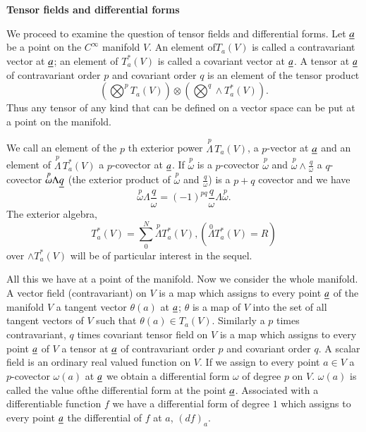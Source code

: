 \medskip
\noindent
{\bf Tensor fields and differential forms}

We proceed to examine the question of tensor fields and differential
forms. Let $\underline{a}$ be a point on the $C^{\infty}$ manifold $V$. An
element of\pageoriginale $T_{a}(V)$ is called a contravariant vector
at $\underline{a}$; an element of $T^{\ast}_{a}(V)$ is called a covariant
vector at $\underline{a}$. A tensor at $\underline{a}$ of contravariant order $p$
and covariant order $q$ is an element of the tensor product
$$
\left(\bigotimes^{p}T_{a}(V)\right)\otimes
\left(\bigotimes^{q} \wedge T^{\ast}_{a}(V)\right).
$$
Thus any tensor of any kind that can be defined on a vector space can
be put at a point on the manifold.

We call an element of the $p$ th exterior power
$\overset{p}{\Lambda}\, T_{a}(V)$, a $p$-vector at $\underline{a}$ and an
element of $\overset{p}{\Lambda} \,T^{\ast}_{a}(V)$ a $p$-covector at
$\underline{a}$. If $\overset{p}{\omega}$ is a $p$-covector 
$\overset{p}{\omega}$ and $\overset{p}{\omega} \wedge
\frac{q}{\omega}$ a $q$-covector
$\overset{p}{\omega}\Lambda \underline{q}$ (the exterior product 
of $\overset{p}{\omega}$ and $\frac{q}{\omega}$) is a $p+q$ covector
and we have
$$
\overset{p}{\omega}\Lambda
\frac{q}{\omega}=(-1)^{pq}\frac{q}{\omega}\Lambda \overset{p}{\omega}.
$$
The exterior algebra,
$$
T^{\ast}_{a}(V)=\sum^{N}_{0}\overset{p}{\Lambda}T^{\ast}_{a}(V),
(\overset{0}{\Lambda}T^{\ast}_{a}(V)=R)   
$$
over $\wedge T^{\ast}_{a}(V)$ will be of particular interest in the sequel.

All this we have at a point of the manifold. Now we consider the whole
manifold. A vector field (contravariant) on $V$ is a map which assigns
to every point $\underline{a}$ of the manifold $V$ a tangent vector
$\theta(a)$ at $\underline{a}$;  $\theta$ is a map of $V$ into the set of all tangent
vectors of $V$ such that $\theta(a)\in T_{a}(V)$. Similarly a $p$
times contravariant, $q$ times covariant tensor field on $V$ is a map
which assigns to every point $\underline{a}$ of $V$ a tensor at $\underline{a}$ of
contravariant order $p$ and covariant order $q$. A scalar field is an
ordinary real valued function on $V$. If we assign to every point
$a\in V$ a $p$-covector $\omega(a)$ at $\underline{a}$ we obtain a
differential form $\omega$ of degree $p$ on $V$. $\omega(a)$ is called
the value of\pageoriginale the differential form at the point
$\underline{a}$. Associated with a differentiable function $f$ we have a
differential form of degree $1$ which assigns to every point $\underline{a}$
the differential of $f$ at $a$, $(df)_{a}$.


